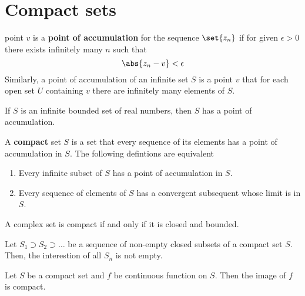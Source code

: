 \section{Compact sets}
\begin{definition}
      point \(v\) is a \textbf{point of accumulation} for the sequence \(\set{z_n}\) if for given \(\epsilon > 0\) there exists infinitely many \(n\) such that 
      \begin{equation*}
            \abs{z_n - v} < \epsilon
      \end{equation*}
      Similarly, a point of accumulation of an infinite set \(S\) is a point \(v\) that for each open set \(U\) containing \(v\) there are infinitely many elements of \(S\).
\end{definition}

\begin{theorem}
      If \(S\) is an infinite bounded set of real numbers, then \(S\) has a point of accumulation.
\end{theorem}

\begin{definition}
      A \textbf{compact} set \(S\) is a set that every sequence of its elements has a point of accumulation in \(S\). The following defintions are equivalent 
      \begin{enumerate}
            \item Every infinite subset of \(S\) has a point of accumulation in \(S\).
            \item Every sequence of elements of \(S\) has a convergent subsequent whose limit is in \(S\).
      \end{enumerate}
\end{definition}

\begin{theorem}
      A complex set is compact if and only if it is closed and bounded.
\end{theorem}

\begin{theorem}
      Let \(S_1 \supset S_2 \supset \dots\) be a sequence of non-empty closed subsets of a compact set \(S\). Then, the interestion of all \(S_n\) is not empty.
\end{theorem}

\begin{theorem}
      Let \(S\) be a compact set and \(f\) be continuous function on \(S\). Then the image of \(f\) is compact.
\end{theorem}

